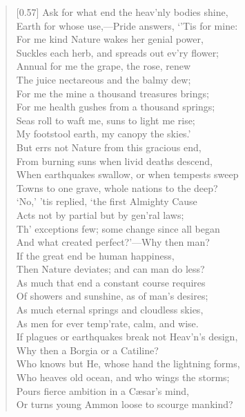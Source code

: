 \begin{verse}[0.57\textwidth]
Ask for what end the heav'nly bodies shine,\\
Earth for whose use,---Pride answers, `'Tis for mine:\\
For me kind Nature wakes her genial power,\\
Suckles each herb, and spreads out ev'ry flower;\\
Annual for me the grape, the rose, renew\\
The juice nectareous and the balmy dew;\\
For me the mine a thousand treasures brings;\\
For me health gushes from a thousand springs;\\
Seas roll to waft me, suns to light me rise;\\
My footstool earth, my canopy the skies.'\\
\vin But errs not Nature from this gracious end,\\
From burning suns when livid deaths descend,\\
When earthquakes swallow, or when tempests sweep\\
Towns to one grave, whole nations to the deep?\\
`No,' 'tis replied, `the first Almighty Cause\\
Acts not by partial but by gen'ral laws;\\
Th' exceptions few; some change since all began\\
And what created perfect?'---Why then man?\\
If the great end be human happiness,\\
Then Nature deviates; and can man do less?\\
As much that end a constant course requires\\
Of showers and sunshine, as of man's desires;\\
As much eternal springs and cloudless skies,\\
As men for ever temp'rate, calm, and wise.\\
If plagues or earthquakes break not Heav'n's design,\\
Why then a Borgia or a Catiline?\\
Who knows but He, whose hand the lightning forms,\\
Who heaves old ocean, and who wings the storms;\\
Pours fierce ambition in a C\ae sar's mind,\\
Or turns young Ammon loose to scourge mankind?\\

\end{verse}
